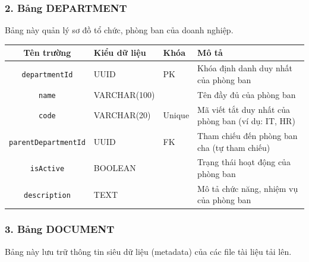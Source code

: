 \documentclass[12pt,a4paper]{report}
\begin{document}
\subsubsection{2. Bảng DEPARTMENT}
Bảng này quản lý sơ đồ tổ chức, phòng ban của doanh nghiệp.

\begin{table}[H]
\centering
\begin{tabularx}{\textwidth}{|c|l|l|X|}
\hline
\rowcolor{gray!10}
Tên trường & Kiểu dữ liệu & Khóa & Mô tả \\ \hline
\texttt{departmentId} & UUID & PK & Khóa định danh duy nhất của phòng ban \\ \hline
\texttt{name} & VARCHAR(100) &  & Tên đầy đủ của phòng ban \\ \hline
\texttt{code} & VARCHAR(20) & Unique & Mã viết tắt duy nhất của phòng ban (ví dụ: IT, HR) \\ \hline
\texttt{parentDepartmentId} & UUID & FK & Tham chiếu đến phòng ban cha (tự tham chiếu) \\ \hline
\texttt{isActive} & BOOLEAN &  & Trạng thái hoạt động của phòng ban \\ \hline
\texttt{description} & TEXT &  & Mô tả chức năng, nhiệm vụ của phòng ban \\ \hline
\end{tabularx}
\end{table}

\subsubsection{3. Bảng DOCUMENT}
Bảng này lưu trữ thông tin siêu dữ liệu (metadata) của các file tài liệu tải lên.
\end{document}
